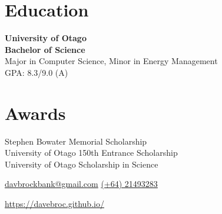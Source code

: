 \documentclass[lighthipster]{simplehipstercv}
\begin{document}
    \begin{minipage}[t]{1\textwidth}
    \section*{Education}
    
    \textbf{University of Otago}\\
    \textbf{Bachelor of Science}\\
    Major in Computer Science, Minor in Energy Management\\
    GPA: 8.3/9.0 (A)\\
    
    \end{minipage}
    \bigskip
    
    \begin{minipage}[t]{1\textwidth}
    \section*{Awards}
    Stephen Bowater Memorial Scholarship\\
    University of Otago 150th Entrance Scholarship\\
    University of Otago Scholarship in Science
    \bigskip
    
    \end{minipage}\hfill
    \bigskip
    \bigskip
    \bigskip
    \bigskip
    \bigskip
\setlength{\parindent}{0pt}

\begin{minipage}[t]{1\textwidth}
\fontfamily{\sfdefault}\selectfont \color{black!70}
{\begin{center}\small 
    \href{mailto:davbrockbank@gmail.com}{ davbrockbank@gmail.com}  
    \href{tel:021493283}{ (+64) 21493283}  
 \end{center}
\begin{center}
    \href{https://davebroc.github.io/}{ https://davebroc.github.io/}
\end{center}
}
\end{minipage}
\end{document}
